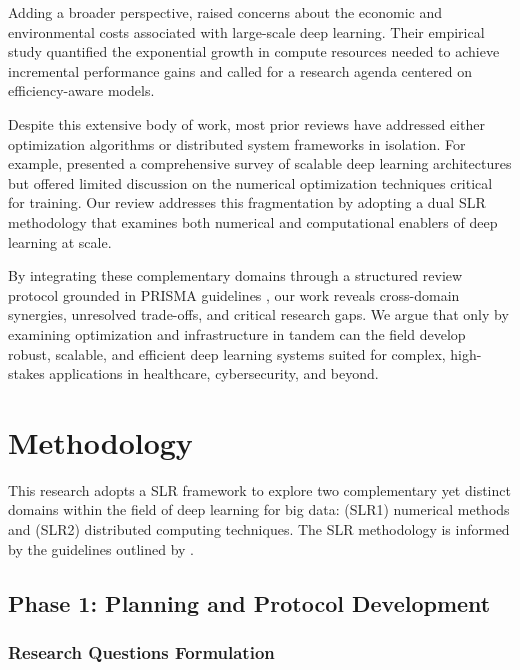 \documentclass[acmsmall]{acmart}
\begin{document}
Adding a broader perspective, \citet{thompson2020computational} raised concerns about the economic and environmental costs associated with large-scale deep learning. Their empirical study quantified the exponential growth in compute resources needed to achieve incremental performance gains and called for a research agenda centered on efficiency-aware models.

Despite this extensive body of work, most prior reviews have addressed either optimization algorithms or distributed system frameworks in isolation. For example, \citet{li2020survey} presented a comprehensive survey of scalable deep learning architectures but offered limited discussion on the numerical optimization techniques critical for training. Our review addresses this fragmentation by adopting a dual SLR methodology that examines both numerical and computational enablers of deep learning at scale.

By integrating these complementary domains through a structured review protocol grounded in PRISMA guidelines \citep{moher2009preferred},
our work reveals cross-domain synergies, unresolved trade-offs, and critical research gaps. We argue that only by examining optimization and infrastructure in tandem can
the field develop robust, scalable, and efficient deep learning systems suited for complex, high-stakes applications in healthcare, cybersecurity, and beyond.

\section{Methodology}\label{sec:methodology}
This research adopts a SLR framework to explore two complementary yet distinct domains within the field of deep learning for big data: (SLR1) numerical methods and (SLR2) distributed computing techniques. The SLR methodology is informed by the guidelines outlined by \citet{kitchenham2004procedures}.

\subsection{Phase 1: Planning and Protocol Development}\label{subsec:phase-1-planning-and-protocol-development}

\subsubsection{Research Questions Formulation}\label{subsubsec:phase-1-planning-and-protocol-development:research-questions-formulation}
\end{document}
